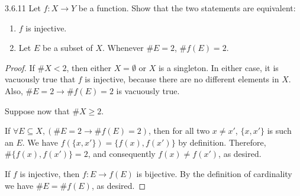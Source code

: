 \begin{exercise}{3.6.11}
	Let $f: X \to Y$ be a function. Show that the two statements are equivalent:
	\begin{enumerate}
		\item $f$ is injective.
		\item Let $E$ be a subset of $X$. Whenever $\#E = 2$, $\#f(E) = 2$.
	\end{enumerate}
\end{exercise}
\begin{proof}
	If $\#X < 2$, then either $X = \emptyset$ or $X$ is a singleton. In either case, it is vacuously true that $f$ is injective, because there are no different elements in $X$. Also, $\#E = 2 \to \#f(E) = 2$ is vacuously true.

	Suppose now that $\#X \ge 2$. 

	\myifbox If $\forall E \subseteq X, (\#E = 2 \to \#f(E) = 2)$, then for all two $x \ne x'$, $\{x,x'\}$ is such an $E$. We have $f(\{x,x'\}) = \{f(x), f(x')\}$ by definition. Therefore, $\#\{f(x),f(x')\} = 2$, and consequently $f(x) \ne f(x')$, as desired.

	\myoifbox If $f$ is injective, then $f: E \to f(E)$ is bijective. By the definition of cardinality we have $\#E = \#f(E)$, as desired.
\end{proof}

